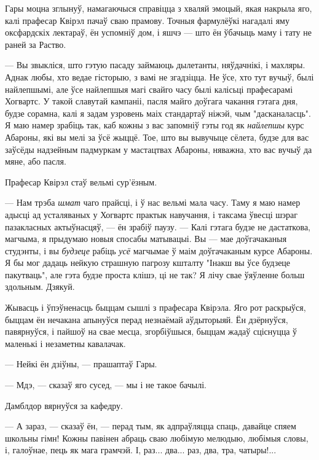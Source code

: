 Гары моцна зглынуў, намагаючыся справіцца з хваляй эмоцый, якая накрыла яго, калі 
прафесар Квірэл пачаў сваю прамову. Точныя фармулёўкі нагадалі яму оксфардскіх
лектараў, ён успомніў дом, і яшчэ --- што ён ўбачыць маму і тату не раней за Раство.

--- Вы звыкліся, што гэтую пасаду займаюць дылетанты, няўдачнікі, і махляры. 
Аднак любы, хто ведае гісторыю, з вамі не згадзіцца. Не ўсе, хто тут вучыў, былі 
найлепшымі, але ўсе найлепшыя магі свайго часу былі калісьці прафесарамі Хогвартс.
У такой славутай кампаніі, пасля майго доўгага чакання гэтага дня, будзе сорамна,
калі я задам  узровень маіх стандартаў ніжэй, чым "дасканаласць". Я маю намер
зрабіць так, каб кожны з вас запомніў гэты год як \emph{найлепшы} курс Абароны, які 
вы мелі за ўсё жыццё. Тое, што вы вывучыце сёлета, будзе для вас заўсёды 
надзейным падмуркам у мастацтвах Абароны, няважна, хто вас вучыў да мяне, або пасля.

Прафесар Квірэл стаў вельмі сур'ёзным.

--- Нам трэба \emph{шмат} чаго прайсці, і ў нас вельмі мала часу. Таму я маю намер адысці 
ад усталяваных у Хогвартс практык навучання, і таксама ўвесці шэраг пазакласных
актыўнасцяў, --- ён зрабіў паузу. --- Калі гэтага будзе не дастаткова, магчыма, 
я прыдумаю новыя спосабы матывацыі. Вы --- мае доўгачаканыя студэнты, і вы 
\emph{будзеце} рабіць \emph{усё} магчымае ў маім доўгачаканым курсе Абароны.
Я бы мог дадаць нейкую страшную пагрозу кшталту "Інакш вы ўсе будзеце пакутваць",
але гэта будзе проста клішэ, ці не так? Я лічу свае ўяўленне больш здольным. Дзякуй.

Жывасць і ўпэўненасць быццам сышлі з прафесара Квірэла. Яго рот раскрыўся,
быццам ён нечакана апынуўся перад незнаёмай аўдыторыяй. Ён дзёрнуўся, павярнуўся, і 
пайшоў на свае месца, згорбіўшыся, быццам жадаў сціснуцца ў маленькі і незаметны кавалачак.

--- Нейкі ён дзіўны, --- прашаптаў Гары.

--- Мдэ, --- сказаў яго сусед, --- мы і не такое бачылі.

Дамблдор вярнуўся за кафедру.

--- А зараз, --- сказаў ён, --- перад тым, як адпраўляцца спаць, давайце спяем 
школьны гімн! Кожны павінен абраць сваю любімую мелюдыю, любімыя словы, і,
галоўнае, пець як мага грамчэй. І, раз... два... раз, два, тра, чатыры!...
